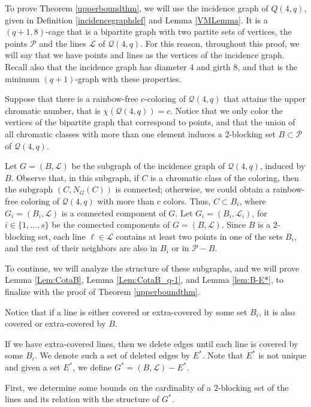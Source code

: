 \documentclass[12pt]{article}
\begin{document}
To prove Theorem \ref{upperboundthm}, we will use the incidence graph of $Q(4,q)$, given in Definition \ref{incidencegraphdef} and Lemma \ref{VMLemma}.  It is a $(q+1,8)$-cage that is a bipartite graph with two partite sets of vertices, the points $\mathcal{P}$ and the lines $\mathcal{L}$ of $\mathcal{Q}(4,q)$. For this reason, throughout this proof, we will say that we have points and lines as the vertices of the incidence graph. Recall also that the incidence graph has diameter 4 and girth 8, and that is the minimum $(q+1)$-graph with these properties. 

Suppose that there is a rainbow-free $c$-coloring of $\mathcal{Q}(4,q)$ that attains the upper chromatic number, that is $\overline{\chi}(\mathcal{Q}(4,q))=c$. %
Notice that we only color the vertices of the bipartite graph that correspond to points, and that the union of all chromatic classes with more than one element induces a $2$-blocking set $B\subset \mathcal{P}$ of ${\mathcal{Q}(4,q)}$.

Let $G = (B, \mathcal{L})$ be the subgraph of the incidence graph of ${\mathcal{Q}(4,q)}$, induced by $B$. Observe that, in this subgraph, if $C$ is a chromatic class of the coloring, then the subgraph $(C, N_G(C))$ is connected; otherwise, we could obtain a rainbow-free coloring of $\mathcal{Q}(4,q)$ with more than c colors. Thus, $C\subset B_i$, where  $G_i=(B_i, \mathcal{L})$ is a connected component of $G$. Let $G_i=(B_i,\mathcal{L}_i)$, for $i\in \{1,\ldots,s\}$ be the connected components of $G=(B,\mathcal{L})$. Since $B$ is a $2$-blocking set, each line $\ell\in\mathcal{L}$ contains at least two points in one of the sets $B_i$, and the rest of their neighbors are also in $B_i$ or in $\mathcal{P}-B$.

To continue, we will analyze the structure of these subgraphs, and we will prove Lemma \ref{Lem:CotaB}, Lemma \ref{Lem:CotaB_q-1}, and Lemma \ref{lem:B-E*}, to finalize with the proof of Theorem \ref{upperboundthm}.

Notice that if a line is either covered or extra-covered by some set $B_i$, it is also covered or extra-covered by $B$.  

If we have extra-covered lines, then we delete edges until each line is covered by some  $B_i$. 
We denote such a set of deleted edges by $E^*$. Note that $E^*$ is not unique and given a set $E^*$, we define $G^*=(B,\mathcal{L})-E^*$. 

First, we determine some bounds on the cardinality of a $2$-blocking set of the lines and its relation with the structure of $G^*$. 
\end{document}

